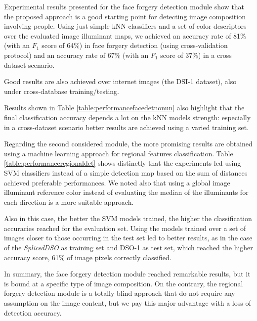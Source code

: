 Experimental results presented for the face forgery detection module show that the proposed approach is a good starting point for detecting image composition involving people. Using just simple kNN classifiers and a set of color descriptors over the evaluated image illuminant maps, we achieved an accuracy rate of 81\%  (with an $F_1$ score of 64\%) in face forgery detection (using cross-validation protocol) and an accuracy rate of 67\% (with an $F_1$ score of 37\%) in a cross dataset scenario.

Good results are also achieved over internet images (the DSI-1 dataset), also under cross-database training/testing.

Results shown in Table \ref{table:performancefacedetnonun} also highlight that the final classification accuracy depends a lot on the kNN models strength: especially in a cross-dataset scenario better results are achieved using a varied training set. 

Regarding the second considered module, the more promising results are obtained using a machine learning approach for regional features classification. Table \ref{table:performanceregionaldet} shows distinctly that the experiments led using SVM classifiers instead of a simple detection map based on the sum of distances achieved preferable performances. We noted also that using a global image illuminant reference color instead of evaluating the median of the illuminants for each direction is a more suitable approach.

Also in this case, the better the SVM models trained, the higher the classification accuracies reached for the evaluation set. Using the models trained over a set of images closer to those occurring in the test set led to better results, as in the case of the \emph{SplicedDSO} as training set and DSO-1 as test set, which reached the higher accuracy score, 61\% of image pixels correctly classified.

In summary, the face forgery detection module reached remarkable results, but it is bound at a specific type of image composition. On the contrary, the regional forgery detection module is a totally blind approach that do not require any assumption on the image content, but we pay this major advantage with a loss of detection accuracy.